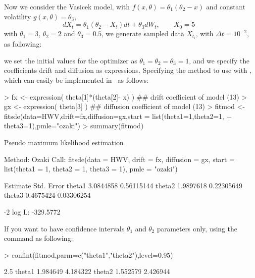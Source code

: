 Now we consider the Vasicek model, with $f(x,\theta) = \theta_{1} (\theta_{2}- x)$ and constant
volatility $g(x,\theta) = \theta_{3}$,
\begin{equation}\label{eq12}
  dX_{t} = \theta_{1} (\theta_{2}- X_{t}) dt + \theta_{3} dW_{t},\qquad X_{0}=5
\end{equation}
with $\theta_{1}=3$, $\theta_{2}=2$ and $\theta_{3}=0.5$, we generate sampled data $X_{t_{i}}$, with $\Delta t =10^{-2}$, as following:
\begin{Schunk}
\end{Schunk}
we set the initial values for the optimizer as $\theta_{1}=\theta_{2}=\theta_{3}=1$, and we specify the coefficients drift and diffusion as expressions.
Specifying the method to use with , which can easily be implemented in \R~as follows:
\begin{Schunk}
\begin{Sinput}
> fx <- expression( theta[1]*(theta[2]- x) ) ## drift coefficient of model (13)
> gx <- expression( theta[3] )           ## diffusion coefficient of model (13)
> fitmod <- fitsde(data=HWV,drift=fx,diffusion=gx,start = list(theta1=1,theta2=1,
+                  theta3=1),pmle="ozaki")
> summary(fitmod)
\end{Sinput}
\begin{Soutput}
Pseudo maximum likelihood estimation

Method:  Ozaki
Call:
fitsde(data = HWV, drift = fx, diffusion = gx, start = list(theta1 = 1,
    theta2 = 1, theta3 = 1), pmle = "ozaki")

        Estimate Std. Error
theta1 3.0844858 0.56115144
theta2 1.9897618 0.22305649
theta3 0.4675424 0.03306254

-2 log L: -329.5772
\end{Soutput}
\end{Schunk}
If you want to have confidence intervals $\theta_{1}$ and $\theta_{2}$ parameters only, using the command  as following:
\begin{Schunk}
\begin{Sinput}
> confint(fitmod,parm=c("theta1","theta2"),level=0.95)
\end{Sinput}
\begin{Soutput}
          2.5 %
theta1 1.984649 4.184322
theta2 1.552579 2.426944
\end{Soutput}
\end{Schunk}


